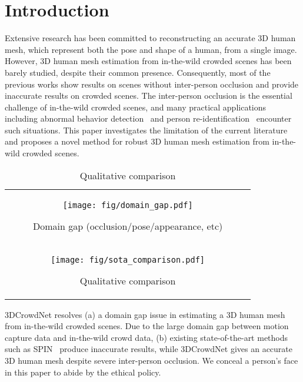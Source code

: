 \documentclass[10pt,twocolumn,letterpaper]{article}
\begin{document}
\section{Introduction}


Extensive research has been committed to reconstructing an accurate 3D human mesh, which represent both the pose and shape of a human, from a single image.
However, 3D human mesh estimation from in-the-wild crowded scenes has been barely studied, despite their common presence.
Consequently, most of the previous works show results on scenes without inter-person occlusion and provide inaccurate results on crowded scenes. 
The inter-person occlusion is the essential challenge of in-the-wild crowded scenes, and many practical applications including abnormal behavior detection~\cite{gatt2019detecting} and person re-identification~\cite{narayan2018re} encounter such situations.
This paper investigates the limitation of the current literature and proposes a novel method for robust 3D human mesh estimation from in-the-wild crowded scenes.

{\centering
\begin{table}[t]
\begin{tabular}{c}

\begin{subfigure}{0.45\textwidth}\centering\texttt{[image: fig/domain\_gap.pdf]}\caption{Domain gap (occlusion/pose/appearance, etc)}\label{fig:domain_gap}\vspace{0.2em}\end{subfigure} \\ 
\begin{subfigure}{0.45\textwidth}\centering\texttt{[image: fig/sota\_comparison.pdf]}\caption{Qualitative comparison}\label{fig:sota_comparison}\end{subfigure}

\end{tabular}

{
3DCrowdNet resolves (a) a domain gap issue in estimating a 3D human mesh from in-the-wild crowded scenes. Due to the large domain gap between motion capture data and in-the-wild crowd data, (b) existing state-of-the-art methods such as SPIN~\cite{kolotouros2019learning} produce inaccurate results, while 3DCrowdNet gives an accurate 3D human mesh despite severe inter-person occlusion. We conceal a person's face in this paper to abide by the ethical policy.
}
\label{fig:front_figure}
\end{table}
}
\setcounter{table}{0}
\end{document}
